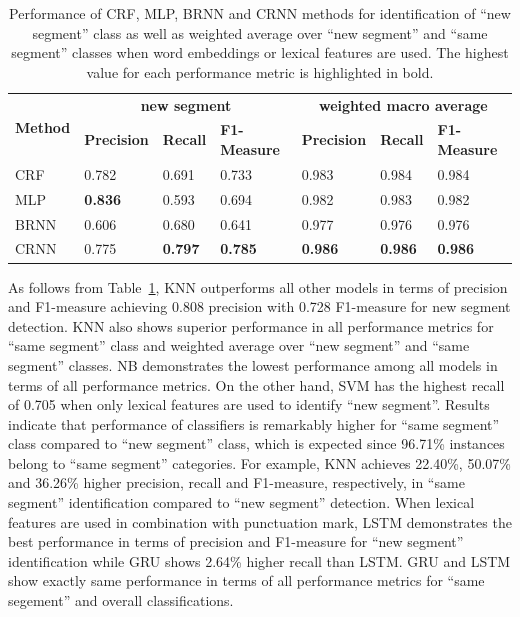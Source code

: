 \documentclass{amia}
\begin{document}
\begin{table}[ht]
\centering
\caption{Performance of CRF, MLP, BRNN and CRNN methods for identification of ``new segment'' class as well as weighted average over ``new segment'' and ``same segment'' classes when word embeddings or lexical features are used. The highest value for each performance metric
is highlighted in bold.}
\label{tab:result_base}
  \begin{tabular}{|l|l|l|l|l|l|l|}
  \hline
   \multirow{2}{*}{\textbf{Method}} & \multicolumn{3}{|c|}{\textbf{new segment}} & \multicolumn{3}{|c|}{\textbf{weighted macro average}} \\\cline{2-7}
   & \textbf{Precision}  & \textbf{Recall} & \textbf{F1-Measure} & \textbf{Precision}  & \textbf{Recall} & \textbf{F1-Measure} \\ \hline    
 CRF & 0.782 & 0.691 & 0.733 & 0.983 & 0.984 & 0.984 \\ \hline
 MLP & \textbf{0.836} & 0.593 & 0.694 & 0.982 & 0.983 & 0.982 \\ \hline
 BRNN & 0.606 & 0.680 & 0.641 & 0.977 & 0.976 & 0.976 \\ \hline
 CRNN & 0.775 & \textbf{0.797} & \textbf{0.785} & \textbf{0.986} & \textbf{0.986} & \textbf{0.986} \\ \hline
  \end{tabular}
\end{table}                         

As follows from Table~\ref{tab:result_base}, KNN outperforms all other models in terms of precision and F1-measure achieving 0.808 precision with 0.728 F1-measure for new segment detection. KNN also shows superior performance in all performance metrics for ``same segment'' class and weighted average over ``new segment'' and ``same segment'' classes. NB demonstrates the lowest performance among all models in terms of all performance metrics. On the other hand, SVM has the highest recall of 0.705 when only lexical features are used to identify ``new segment''. Results indicate that performance of classifiers is remarkably higher for ``same segment'' class compared to ``new segment'' class, which is expected since 96.71\% instances belong to ``same segment'' categories. For example, KNN achieves 22.40\%, 50.07\% and 36.26\% higher precision, recall and F1-measure, respectively, in ``same segment'' identification compared to ``new segment'' detection. When lexical features are used in combination with punctuation mark, LSTM demonstrates the best performance in terms of precision and F1-measure for ``new segment'' identification while GRU shows 2.64\% higher recall than LSTM. GRU and LSTM show exactly same performance in terms of all performance metrics for ``same segement'' and overall classifications. \\  
\end{document}

